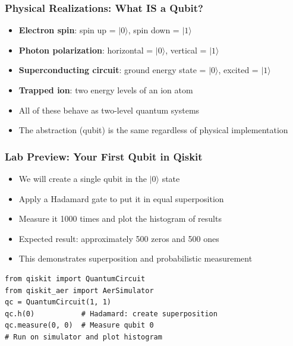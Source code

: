 \begin{frame}[fragile]\frametitle{Physical Realizations: What IS a Qubit?}
\begin{itemize}
\item \textbf{Electron spin}: spin up = $|0\rangle$, spin down = $|1\rangle$
\item \textbf{Photon polarization}: horizontal = $|0\rangle$, vertical = $|1\rangle$
\item \textbf{Superconducting circuit}: ground energy state = $|0\rangle$, excited = $|1\rangle$
\item \textbf{Trapped ion}: two energy levels of an ion atom
\item All of these behave as two-level quantum systems
\item The abstraction (qubit) is the same regardless of physical implementation
\end{itemize}
\end{frame}

\begin{frame}[fragile]\frametitle{Lab Preview: Your First Qubit in Qiskit}
\begin{itemize}
\item We will create a single qubit in the $|0\rangle$ state
\item Apply a Hadamard gate to put it in equal superposition
\item Measure it 1000 times and plot the histogram of results
\item Expected result: approximately 500 zeros and 500 ones
\item This demonstrates superposition and probabilistic measurement
\end{itemize}
\begin{verbatim}
from qiskit import QuantumCircuit
from qiskit_aer import AerSimulator
qc = QuantumCircuit(1, 1)
qc.h(0)           # Hadamard: create superposition
qc.measure(0, 0)  # Measure qubit 0
# Run on simulator and plot histogram
\end{verbatim}
\end{frame}

